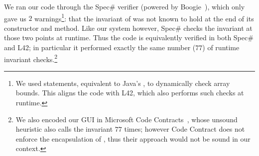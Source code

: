 We ran our code through the Spec\# verifier (powered by Boogie~\cite{DBLP:conf/fmco/BarnettCDJL05}), which only gave us $2$ warnings\footnote{We used \Q@assume@ statements, equivalent to Java's \Q@assert@, to dynamically check array bounds. %
This aligns the code with L42, which also performs such checks at runtime.}: that the invariant of \Q@SafeMovable@ was not known to hold at the end of its constructor and \Q@dispatch@ method. Like our system however, Spec\# checks the invariant
at those two points at runtime. Thus the code is equivalently verified in both Spec\# and L42; in particular it performed exactly the same number ($77$) of runtime invariant checks.\footnote{%
We also encoded our GUI in Microsoft Code Contracts~\cite{DBLP:conf/sac/FahndrichBL10}, whose unsound heuristic also calls the invariant $77$ times; however Code Contract does not enforce the
encapsulation of \Q@children@, thus their approach would not be sound in our context.}




